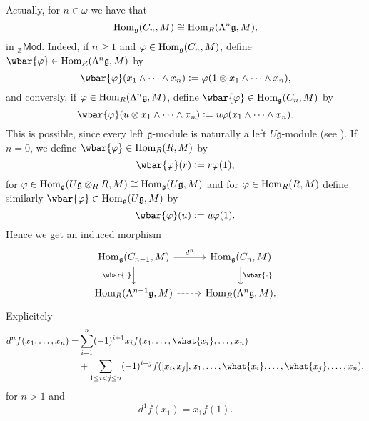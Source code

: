 \begin{remark}
	Actually, for $n \in \omega$ we have that 
	\begin{equation*}
		\operatorname{Hom}_\mathfrak{g}(C_n,M) \cong \operatorname{Hom}_R(\Lambda^n \mathfrak{g},M),
	\end{equation*}
	\noindent in $_{\mathbb{Z}}\mathsf{Mod}$. Indeed, if $n \geq 1$ and $\varphi \in \operatorname{Hom}_\mathfrak{g}(C_n,M)$, define $\wbar{\varphi} \in \Hom_R(\Lambda^n \mathfrak{g},M)$ by 
	\begin{equation*}
		\wbar{\varphi}(x_1 \wedge \dots \wedge x_n) := \varphi(1 \otimes x_1 \wedge \dots \wedge x_n),
	\end{equation*}
	\noindent and conversly, if $\varphi \in \operatorname{Hom}_R(\Lambda^n \mathfrak{g},M)$, define $\wbar{\varphi} \in \Hom_\mathfrak{g}(C_n,M)$ by
	\begin{equation*}
		\wbar{\varphi}(u \otimes x_1 \wedge \dots \wedge x_n) := u \varphi(x_1 \wedge \dots \wedge x_n).
	\end{equation*}
	\noindent This is possible, since every left $\mathfrak{g}$-module is naturally a left $U\mathfrak{g}$-module (see \cite[224--225]{weibel:homological_algebra:1994}). If $n = 0$, we define $\wbar{\varphi} \in \Hom_R(R,M)$ by 
	\begin{equation*}
		\wbar{\varphi}(r) := r\varphi(1),
	\end{equation*}
	\noindent for $\varphi \in \operatorname{Hom}_\mathfrak{g}(U\mathfrak{g} \otimes_R R,M) \cong \operatorname{Hom}_\mathfrak{g}(U\mathfrak{g},M)$ and for $\varphi \in \operatorname{Hom}_R(R,M)$ define similarly $\wbar{\varphi} \in \Hom_\mathfrak{g}(U\mathfrak{g},M)$ by
	\begin{equation*}
		\wbar{\varphi}(u) := u\varphi(1).
	\end{equation*}
	Hence we get an induced morphism 
	\begin{equation*}
		\begin{tikzcd}
			\Hom_\mathfrak{g}(C_{n - 1},M) \arrow[r,"d^n"]\arrow[d,"\wbar{\cdot}"'] & \Hom_\mathfrak{g}(C_n,M)\arrow[d,"\wbar{\cdot}"]\\
			\Hom_R(\Lambda^{n - 1}\mathfrak{g},M) \arrow[r,dashed] & \Hom_R(\Lambda^n\mathfrak{g},M).
		\end{tikzcd}
	\end{equation*}
	Explicitely
	\begin{align*}
		d^nf(x_1,\dots,x_n) =& \sum_{i = 1}^n(-1)^{i + 1}x_i f(x_1,\dots,\what{x_i},\dots,x_n)\\
		&+ \sum_{1 \leq i < j \leq n}(-1)^{i + j} f([x_i,x_j],x_1,\dots,\what{x_i},\dots,\what{x_j},\dots,x_n),
	\end{align*}
	\noindent for $n > 1$ and 
	\begin{equation*}
		d^1f(x_1) = x_1f(1).
	\end{equation*}
\end{remark}


